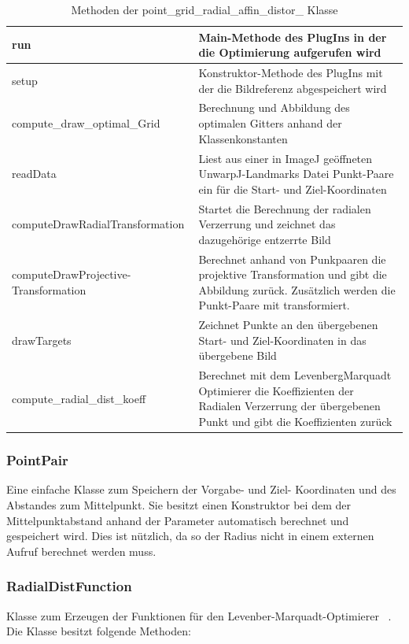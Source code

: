 \begin{table}[H]
	\begin{tabular}{|p{} | p{}|} 
		\hline
		run & Main-Methode des PlugIns in der die Optimierung aufgerufen wird\\ \hline
		setup & Konstruktor-Methode des PlugIns mit der die Bildreferenz abgespeichert wird\\ \hline
		compute\_draw\_optimal\_Grid & Berechnung und Abbildung des optimalen Gitters anhand der Klassenkonstanten \\ \hline
		readData & Liest aus einer in ImageJ geöffneten UnwarpJ-Landmarks Datei Punkt-Paare ein für die Start- und Ziel-Koordinaten\\\hline
		computeDrawRadialTransformation & Startet die Berechnung der radialen Verzerrung und zeichnet das dazugehörige entzerrte Bild\\ \hline
		computeDrawProjective-Transformation & Berechnet anhand von Punkpaaren die projektive Transformation und gibt die Abbildung zurück. Zusätzlich werden die Punkt-Paare mit transformiert.\\ \hline
		drawTargets & Zeichnet Punkte an den übergebenen Start- und Ziel-Koordinaten in das übergebene Bild\\ \hline
		compute\_radial\_dist\_koeff & Berechnet mit dem LevenbergMarquadt Optimierer die Koeffizienten der Radialen Verzerrung der übergebenen Punkt und gibt die Koeffizienten zurück\\ 
		\hline
	\end{tabular}
	\caption{Methoden der point\_grid\_radial\_affin\_distor\_ Klasse}
\end{table}

\subsubsection{PointPair}
Eine einfache Klasse zum Speichern der Vorgabe- und Ziel- Koordinaten und des Abstandes zum Mittelpunkt. Sie besitzt einen Konstruktor bei dem der Mittelpunktabstand anhand der Parameter automatisch berechnet und gespeichert wird. Dies ist nützlich, da so der Radius nicht in einem externen Aufruf berechnet werden muss.

\subsubsection{RadialDistFunction}
Klasse zum Erzeugen der Funktionen für den Levenber-Marquadt-Optimierer ~\cite{optimizer_example}. Die Klasse besitzt folgende Methoden:

